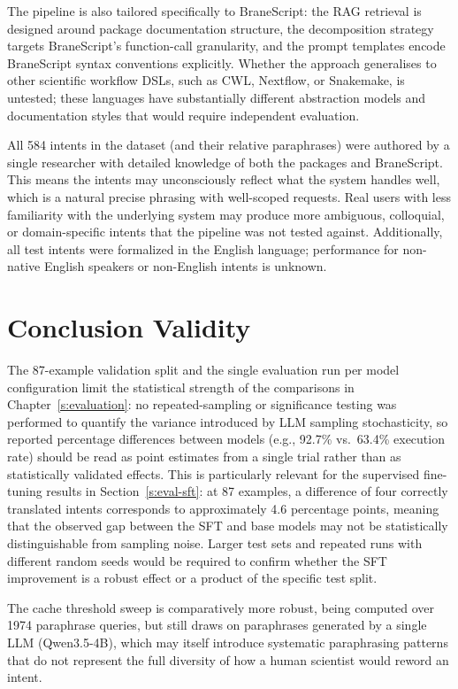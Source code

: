 The pipeline is also tailored specifically to BraneScript: the RAG retrieval
is designed around package documentation structure, the decomposition strategy
targets BraneScript's function-call granularity, and the prompt templates
encode BraneScript syntax conventions explicitly. Whether the approach
generalises to other scientific workflow DSLs, such as CWL, Nextflow, or
Snakemake, is untested; these languages have substantially different
abstraction models and documentation styles that would require independent
evaluation.

All 584 intents in the dataset (and their relative paraphrases) were authored by a single researcher with
detailed knowledge of both the packages and BraneScript. This means the
intents may unconsciously reflect what the system handles well, which is a natural
precise phrasing with well-scoped requests. 
Real users with less familiarity with the underlying system may
produce more ambiguous, colloquial, or domain-specific intents that the
pipeline was not tested against. Additionally, all test intents were formalized in the English language;
performance for non-native English speakers or non-English intents is unknown.

\section{Conclusion Validity}

The 87-example validation split and the single evaluation run per model
configuration limit the statistical strength of the comparisons in
Chapter~\ref{s:evaluation}: no repeated-sampling or significance testing was
performed to quantify the variance introduced by LLM sampling stochasticity,
so reported percentage differences between models (e.g., 92.7\% vs.\ 63.4\%
execution rate) should be read as point estimates from a single trial rather
than as statistically validated effects. This is particularly relevant for the
supervised fine-tuning results in Section~\ref{s:eval-sft}: at 87 examples, a
difference of four correctly translated intents corresponds to approximately
4.6 percentage points, meaning that the observed gap between the SFT and base
models may not be statistically distinguishable from sampling noise. Larger
test sets and repeated runs with different random seeds would be required to
confirm whether the SFT improvement is a robust effect or a product of the
specific test split.

The cache threshold sweep is
comparatively more robust, being computed over 1974 paraphrase queries, but
still draws on paraphrases generated by a single LLM (Qwen3.5-4B), which may
itself introduce systematic paraphrasing patterns that do not represent the
full diversity of how a human scientist would reword an intent.